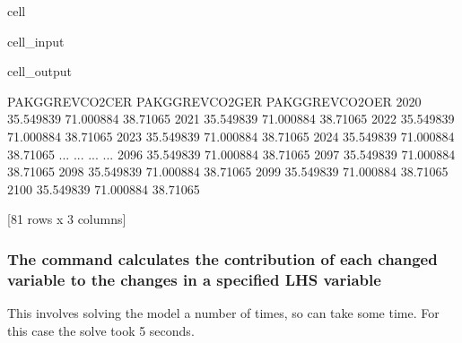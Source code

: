 \documentclass[letterpaper,10pt,english]{jupyterBook}
\begin{document}
\begin{sphinxuseclass}{cell}\begin{sphinxVerbatimInput}

\begin{sphinxuseclass}{cell_input}
\begin{sphinxVerbatim}[commandchars=\\\{\}]
\end{sphinxVerbatim}

\end{sphinxuseclass}\end{sphinxVerbatimInput}
\begin{sphinxVerbatimOutput}

\begin{sphinxuseclass}{cell_output}
\begin{sphinxVerbatim}[commandchars=\\\{\}]
      PAKGGREVCO2CER  PAKGGREVCO2GER  PAKGGREVCO2OER
2020       35.549839       71.000884        38.71065
2021       35.549839       71.000884        38.71065
2022       35.549839       71.000884        38.71065
2023       35.549839       71.000884        38.71065
2024       35.549839       71.000884        38.71065
...              ...             ...             ...
2096       35.549839       71.000884        38.71065
2097       35.549839       71.000884        38.71065
2098       35.549839       71.000884        38.71065
2099       35.549839       71.000884        38.71065
2100       35.549839       71.000884        38.71065

[81 rows x 3 columns]
\end{sphinxVerbatim}

\end{sphinxuseclass}\end{sphinxVerbatimOutput}

\end{sphinxuseclass}

\subsubsection{The  command calculates the contribution of each changed variable to the changes in a specified LHS variable}
\label{\detokenize{content/06_ModelAnalytics/AttributionSomeFeatures:the-totdif-command-calculates-the-contribution-of-each-changed-variable-to-the-changes-in-a-specified-lhs-variable}}
\sphinxAtStartPar
This involves solving the model a number of times, so can take some time. For this case the solve took 5 seconds.
\end{document}
